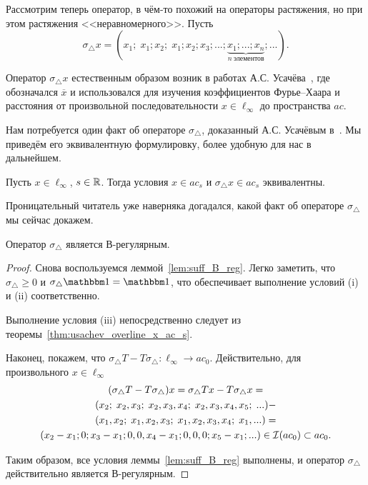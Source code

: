 Рассмотрим теперь оператор,
в чём-то похожий на операторы растяжения,
но при этом растяжения <<неравномерного>>.
Пусть
\begin{equation}
	\sigma_\triangle x =
	(x_1; \; x_1; x_2; \; x_1; x_2; x_3; ... ; \underbrace{x_1; ...; x_n}_{n~\mbox{элементов}}; ...)
	.
\end{equation}

\begin{remark}
	Оператор $\sigma_\triangle x$ естественным образом возник в работах А.С. Усачёва~\cite{usachev2009_phd_vsu},
	где обозначался $\overline{x}$ и
	использовался для изучения коэффициентов Фурье--Хаара
	и расстояния от произвольной последовательности $x\in\ell_\infty$
	до пространства $ac$.
\end{remark}

Нам потребуется один факт об операторе $\sigma_\triangle$,
доказанный А.С. Усачёвым в~\cite[теорема 19]{usachev2009_phd_vsu}.
Мы приведём его эквивалентную формулировку, более удобную для нас в дальнейшем.

\begin{theorem}
	\label{thm:usachev_overline_x_ac_s}
	Пусть $x\in\ell_\infty$, $s\in\mathbb{R}$.
	Тогда условия $x\in ac_s$ и $\sigma_\triangle x \in ac_s$ эквивалентны.
\end{theorem}

Проницательный читатель уже наверняка догадался,
какой факт об операторе $\sigma_\triangle$ мы сейчас докажем.

\begin{theorem}
	Оператор $\sigma_\triangle$ является В-регулярным.
\end{theorem}

\begin{proof}
	Снова воспользуемся леммой~\ref{lem:suff_B_reg}.
	Легко заметить, что $\sigma_\triangle \geq 0$ и $\sigma_\triangle \one  = \one$,
	что обеспечивает выполнение условий (i) и (ii) соответственно.

	Выполнение условия (iii) непосредственно следует из теоремы~\ref{thm:usachev_overline_x_ac_s}.

	Наконец, покажем, что $\sigma_\triangle T - T \sigma_\triangle  : \ell_\infty \to ac_0$.
	Действительно, для произвольного $x\in\ell_\infty$
	\begin{multline}
	(\sigma_\triangle T - T \sigma_\triangle)x =
	\sigma_\triangle Tx - T \sigma_\triangle x =
	\\
	(x_2; \; x_2, x_3; \; x_2, x_3,   x_4; \; x_2, x_3, x_4, x_5; \; ... )-
	\\
	(x_1, x_2; \; x_1,    x_2, x_3; \; x_1,   x_2, x_3, x_4; \; x_1, ... )=
	\\
	(x_2-x_1; 0; x_3-x_1; 0, 0, x_4-x_1; 0,0,0; x_5-x_1; ...) \in\mathcal{I}(ac_0)\subset ac_0
	.
	\end{multline}

	Таким образом, все условия леммы~\ref{lem:suff_B_reg} выполнены,
	и оператор $\sigma_\triangle$ действительно является В-регулярным.
\end{proof}

